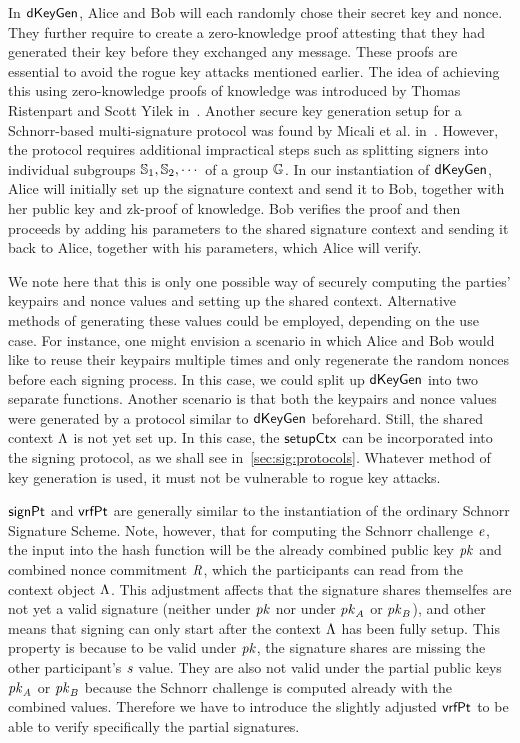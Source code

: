 In $\mathsf{dKeyGen}$, Alice and Bob will each randomly chose their secret key and nonce.
They further require to create a zero-knowledge proof attesting that they had generated their key before they exchanged any message.
These proofs are essential to avoid the rogue key attacks mentioned earlier.
The idea of achieving this using zero-knowledge proofs of knowledge was introduced by Thomas Ristenpart and Scott Yilek in~\cite{ristenpart2007power}.
Another secure key generation setup for a Schnorr-based multi-signature protocol was found by Micali et al. in~\cite{micali2001accountable}.
However, the protocol requires additional impractical steps such as splitting signers into individual subgroups $\mathbb{S}_1, \mathbb{S}_{2}, \cdots$ of a group $\mathbb{G}$.
In our instantiation of $\mathsf{dKeyGen}$, Alice will initially set up the signature context and send it to Bob, together with her public key and zk-proof of knowledge.
Bob verifies the proof and then proceeds by adding his parameters to the shared signature context and sending it back to Alice, together with his parameters, which Alice will verify.

We note here that this is only one possible way of securely computing the parties' keypairs and nonce values and setting up the shared context.
Alternative methods of generating these values could be employed, depending on the use case.
For instance, one might envision a scenario in which Alice and Bob would like to reuse their keypairs multiple times and only regenerate the random nonces before each signing process.
In this case, we could split up $\mathsf{dKeyGen}$ into two separate functions.
Another scenario is that both the keypairs and nonce values were generated by a protocol similar to $\mathsf{dKeyGen}$ beforehard.
Still, the shared context $\Lambda$ is not yet set up.
In this case, the $\mathsf{setupCtx}$ can be incorporated into the signing protocol, as we shall see in~\cref{sec:sig:protocols}.
Whatever method of key generation is used, it must not be vulnerable to rogue key attacks.

$\mathsf{signPt}$ and $\mathsf{vrfPt}$ are generally similar to the instantiation of the ordinary Schnorr Signature Scheme.
Note, however, that for computing the Schnorr challenge $\mathit{e}$, the input into the hash function will be the already combined public key $\mathit{pk}$ and combined nonce commitment $\mathit{R}$, which the participants can read from the context object $\Lambda$.
This adjustment affects that the signature shares themselfes are not yet a valid signature (neither under $\mathit{pk}$ nor under $\mathit{pk}_{\mathit{A}}$ or $\mathit{pk}_{\mathit{B}}$), and other means that signing can only start after the context $\Lambda$ has been fully setup.
This property is because to be valid under $\mathit{pk}$, the signature shares are missing the other participant's $\mathit{s}$ value.
They are also not valid under the partial public keys $\mathit{pk}_{\mathit{A}}$ or $\mathit{pk}_{\mathit{B}}$ because the Schnorr challenge is computed already with the combined values.
Therefore we have to introduce the slightly adjusted $\mathsf{vrfPt}$ to be able to verify specifically the partial signatures.

